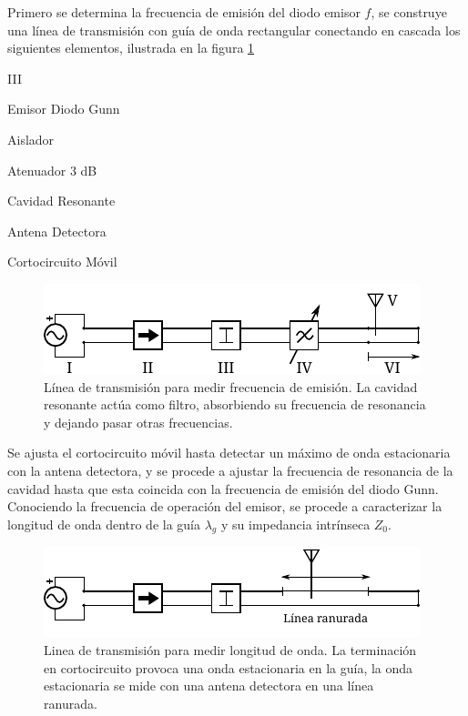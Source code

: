 \documentclass[11pt,a4paper]{article}
\begin{document}
\begin{multicols}{2}
Primero se determina la frecuencia de emisión del diodo emisor $f$, se construye una línea de transmisión con guía de onda rectangular conectando en cascada los siguientes elementos, ilustrada en la figura \ref{fig:arr1}
\begin{multicols}{2}
    \begin{labeling}{III} 
        \item [I] Emisor Diodo Gunn
        \item [II] Aislador
        \item [III] Atenuador 3 dB
        \item [IV] Cavidad Resonante
        \item [V] Antena Detectora
        \item [VI] Cortocircuito Móvil
    \end{labeling}        
\end{multicols}
\begin{figure}[H]
    \centering
    \includegraphics[width=\linewidth]{Images/arreglo1.pdf}
    \caption{Línea de transmisión para medir frecuencia de emisión. La cavidad resonante actúa como filtro, absorbiendo su frecuencia de resonancia y dejando pasar otras frecuencias.}
    \label{fig:arr1}
\end{figure}
Se ajusta el cortocircuito móvil hasta detectar un máximo de onda estacionaria con la antena detectora, y se procede a ajustar la frecuencia de resonancia de la cavidad hasta que esta coincida con la frecuencia de emisión del diodo Gunn.\\

Conociendo la frecuencia de operación del emisor, se procede a caracterizar la longitud de onda dentro de la guía $\lambda_g$ y su impedancia intrínseca $Z_0$. 
\begin{figure}[H]
    \centering
    \includegraphics[width=\linewidth]{Images/arreglo2.pdf}
    \caption{Linea de transmisión para medir longitud de onda. La terminación en cortocircuito provoca una onda estacionaria en la guía, la onda estacionaria se mide con una antena detectora en una línea ranurada.}
    \label{fig:arr2}
\end{figure}


\end{multicols}
\end{document}
